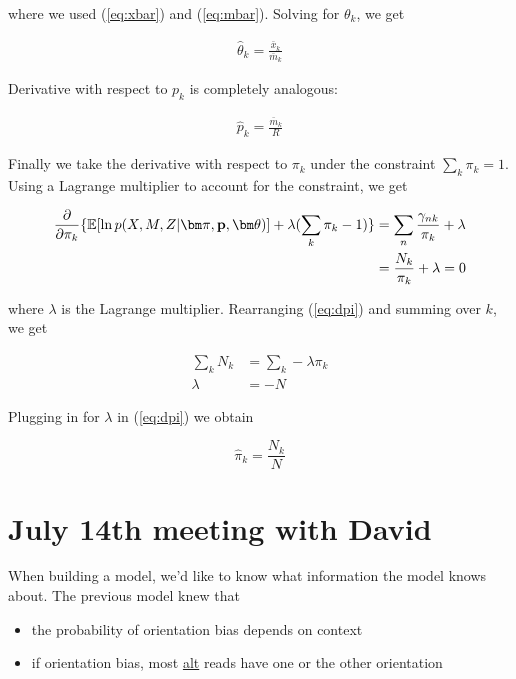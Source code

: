 \documentclass[a4paper]{article}
\newcommand{\vp}{{\bf p}}
\newcommand{\vpi}{{\bm \pi}}
\newcommand{\vtheta}{{\bm \theta}}
\newcommand{\E}{\mathbb{E}}
\begin{document}
where we used (\ref{eq:xbar}) and (\ref{eq:mbar}). Solving for $\theta_k$, we get

\begin{align}
\hat{\theta}_k = \frac{\bar{x}_k}{\bar{m}_k} \label{eq:theta}
\end{align}

Derivative with respect to $p_k$ is completely analogous:

\begin{align}
\hat{p}_k = \frac{\bar{m}_k}{R} \label{eq:p}
\end{align}

Finally we take the derivative with respect to $\pi_k$ under the constraint $\sum_k \pi_k = 1$. Using a Lagrange multiplier to account for the constraint, we get

\begin{align}
\frac{\partial}{\partial \pi_k} \{ \E [ \ln p(X, M , Z | \vpi, \vp, \vtheta) ] + \lambda ( \sum_k \pi_k - 1)\} &= \sum_n \frac{\gamma_{nk}}{\pi_k} + \lambda \nonumber \\
																   &= \frac{N_k}{\pi_k} + \lambda = 0 \label{eq:dpi}
\end{align}

where $\lambda$ is the Lagrange multiplier. Rearranging (\ref{eq:dpi}) and summing over $k$, we get

\begin{align*}
\sum_k N_k &= \sum_k - \lambda \pi_k \\
      \lambda &= - N 
\end{align*}

Plugging in for $\lambda$ in (\ref{eq:dpi}) we obtain

\begin{equation}
\hat{\pi}_k = \frac{N_k}{N}
\end{equation}




\section{July 14th meeting with David}

When building a model, we'd like to know what information the model knows about. The previous model knew that 

\begin{itemize}
\item the probability of orientation bias depends on context
\item if orientation bias, most \underline{alt} reads have one or the other orientation
\end{itemize}
\end{document}
